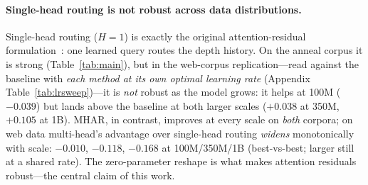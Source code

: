 \documentclass{article}
\begin{document}
\paragraph{Single-head routing is not robust across data distributions.}
Single-head routing ($H{=}1$) is exactly the original attention-residual
formulation~\citep{kimi2025attention}: one learned query routes the depth history.
On the anneal corpus it is strong (Table~\ref{tab:main}), but in the
web-corpus replication---read against the baseline with \emph{each method at
its own optimal learning rate} (Appendix Table~\ref{tab:lrsweep})---it is
\emph{not} robust as
the model grows: it helps at
100M ($-0.039$) but lands above the baseline at both larger scales ($+0.038$ at
350M, $+0.105$ at 1B). MHAR, in
contrast, improves at every scale on \emph{both} corpora; on web data
multi-head's advantage over single-head routing
\emph{widens} monotonically with scale: $-0.010$, $-0.118$, $-0.168$ at 100M/350M/1B
(best-vs-best; larger still at a shared rate). The zero-parameter reshape is
what makes attention residuals robust---the central claim of this work.



\iffalse
\end{document}
